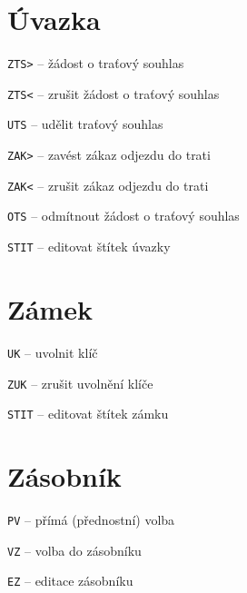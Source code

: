 \documentclass[12pt,a4paper,landscape]{article}
\begin{document}
\begin{multicols}{3}
\section{Úvazka}
\begin{compactitem}
	\item \texttt{ZTS>} -- žádost o traťový souhlas
	\item \texttt{ZTS<} -- zrušit žádost o traťový souhlas
	\item \texttt{UTS} -- udělit traťový souhlas
	\item \texttt{ZAK>} -- zavést zákaz odjezdu do trati
	\item \texttt{ZAK<} -- zrušit zákaz odjezdu do trati
	\item \texttt{OTS} -- odmítnout žádost o traťový souhlas
	\item \texttt{STIT} -- editovat štítek úvazky
\end{compactitem}

\section{Zámek}
\begin{compactitem}
	\item \texttt{UK} -- uvolnit klíč
	\item \texttt{ZUK} -- zrušit uvolnění klíče
	\item \texttt{STIT} -- editovat štítek zámku
\end{compactitem}

\section{Zásobník}
\begin{compactitem}
	\item \texttt{PV} -- přímá (přednostní) volba
	\item \texttt{VZ} -- volba do zásobníku
	\item \texttt{EZ} -- editace zásobníku
\end{compactitem}

\end{multicols}
\end{document}
